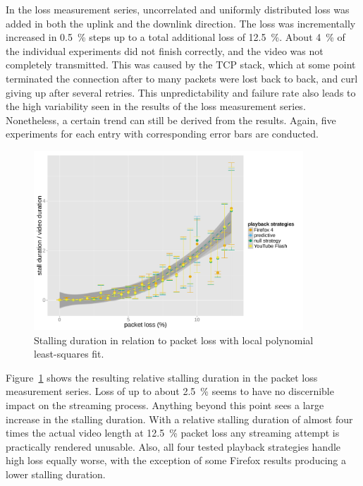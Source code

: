 In the loss measurement series, uncorrelated and uniformly distributed loss was added in both the uplink and the downlink direction. The loss was incrementally increased in \SI{0.5}{\percent} steps up to a total additional loss of \SI{12.5}{\percent}. About \SI{4}{\percent} of the individual experiments did not finish correctly, and the video was not completely transmitted. This was caused by the \gls{TCP} stack, which at some point terminated the connection after to many packets were lost back to back, and curl giving up after several retries. This unpredictability and failure rate also leads to the high variability seen in the results of the loss measurement series. Nonetheless, a certain trend can still be derived from the results. Again, five experiments for each entry with corresponding error bars are conducted.


\begin{figure}[htbp]
	\centering
	\includegraphics[width=0.9\textwidth]{images/R-playbackemulation-stallduration-loss.pdf}
	\caption{Stalling duration in relation to packet loss with local polynomial least-squares fit.}
\label{c3:fig:eval-loss-stallingtime}
\end{figure}

Figure~\ref{c3:fig:eval-loss-stallingtime} shows the resulting relative stalling duration in the packet loss measurement series. Loss of up to about \SI{2.5}{\percent} seems to have no discernible impact on the streaming process. Anything beyond this point sees a large increase in the stalling duration. With a relative stalling duration of almost four times the actual video length at \SI{12.5}{\percent} packet loss any streaming attempt is practically rendered unusable. Also, all four tested playback strategies handle high loss equally worse, with the exception of some Firefox results producing a lower stalling duration.

